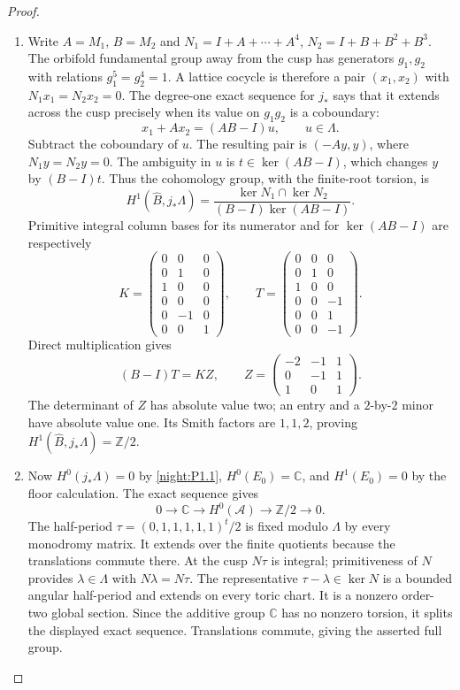 \begin{proof}
\begin{enumerate}[label={$\langle1\rangle$\arabic*.}]
\item Write $A=M_1$, $B=M_2$ and
$N_1=I+A+\cdots+A^4$, $N_2=I+B+B^2+B^3$.
The orbifold fundamental group away from the cusp has generators
$g_1,g_2$ with relations $g_1^5=g_2^4=1$.  A lattice cocycle is
therefore a pair $(x_1,x_2)$ with $N_1x_1=N_2x_2=0$.
The degree-one exact sequence for $j_*$ says that it extends across
the cusp precisely when its value on $g_1g_2$ is a coboundary:
\[
x_1+Ax_2=(AB-I)u,\qquad u\in\Lambda.
\]
Subtract the coboundary of $u$.  The resulting pair is $(-Ay,y)$,
where $N_1y=N_2y=0$.  The ambiguity in $u$ is
$t\in\ker(AB-I)$, which changes $y$ by $(B-I)t$.
Thus the cohomology group, with the finite-root torsion, is
\[
H^1(\widehat B,j_*\Lambda)=
\frac{\ker N_1\cap\ker N_2}{(B-I)\ker(AB-I)}.
\]
Primitive integral column bases for its numerator and for
$\ker(AB-I)$ are respectively
\[
K=\begin{pmatrix}
0&0&0\\0&1&0\\1&0&0\\0&0&0\\0&-1&0\\0&0&1
\end{pmatrix},\qquad
T=\begin{pmatrix}
0&0&0\\0&1&0\\1&0&0\\0&0&-1\\0&0&1\\0&0&-1
\end{pmatrix}.
\]
Direct multiplication gives
\[
(B-I)T=KZ,\qquad
Z=\begin{pmatrix}-2&-1&1\\0&-1&1\\1&0&1\end{pmatrix}.
\]
The determinant of $Z$ has absolute value two; an entry and a
$2$-by-$2$ minor have absolute value one.  Its Smith factors are
$1,1,2$, proving $H^1(\widehat B,j_*\Lambda)=\mathbb Z/2$.
\item Now $H^0(j_*\Lambda)=0$ by \cref{night:P1.1},
$H^0(E_0)=\mathbb C$, and $H^1(E_0)=0$ by the floor
calculation. The exact sequence gives
\[
0\to\mathbb C\to H^0(\mathcal A)\to\mathbb Z/2\to0.
\]
The half-period
$\tau=(0,1,1,1,1,1)^t/2$ is fixed modulo $\Lambda$
by every monodromy matrix. It extends over the finite
quotients because the translations commute there.
At the cusp $N\tau$ is integral; primitiveness of $N$
provides $\lambda\in\Lambda$ with $N\lambda=N\tau$.
The representative $\tau-\lambda\in\ker N$ is a bounded
angular half-period and extends on every toric chart.
It is a nonzero order-two global section. Since the
additive group $\mathbb C$ has no nonzero torsion, it
splits the displayed exact sequence. Translations
commute, giving the asserted full group.


\end{enumerate}
\end{proof}
